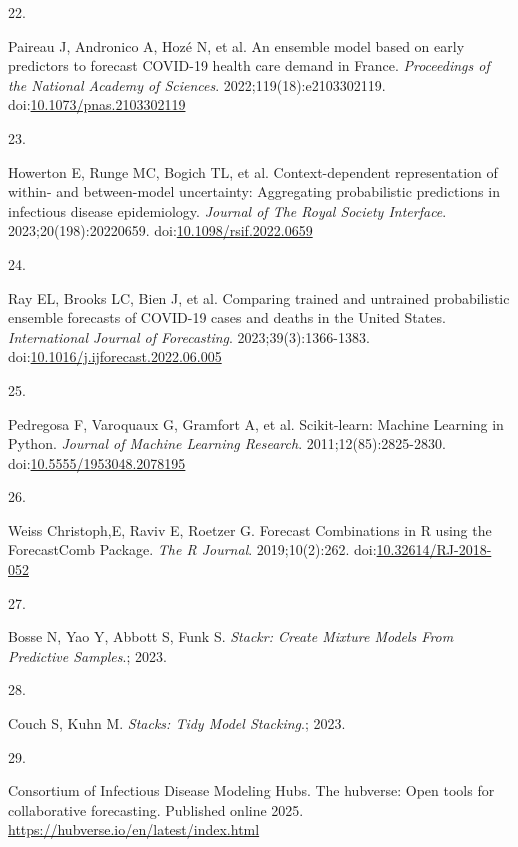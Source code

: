 \documentclass[
  letterpaper,
  DIV=11,
  numbers=noendperiod]{scrartcl}
\newlength{\cslhangindent}
\newlength{\csllabelwidth}
\newenvironment{CSLReferences}[2] %
 {\begin{list}{}{%
  \setlength{\itemindent}{0pt}
  \setlength{\leftmargin}{0pt}
  \setlength{\parsep}{0pt}
  \ifodd #1
   \setlength{\leftmargin}{\cslhangindent}
   \setlength{\itemindent}{-1\cslhangindent}
  \fi
  \setlength{\itemsep}{#2\baselineskip}}}
 {\end{list}}
\newcommand{\CSLLeftMargin}[1]{\parbox[t]{\csllabelwidth}{\strut#1\strut}}
\newcommand{\CSLRightInline}[1]{\parbox[t]{\linewidth - \csllabelwidth}{\strut#1\strut}}
\begin{document}
\begin{CSLReferences}{0}{1}
\CSLLeftMargin{22. }%
\CSLRightInline{Paireau J, Andronico A, Hozé N, et al. An ensemble model
based on early predictors to forecast {COVID}-19 health care demand in
{France}. \emph{Proceedings of the National Academy of Sciences}.
2022;119(18):e2103302119.
doi:\href{https://doi.org/10.1073/pnas.2103302119}{10.1073/pnas.2103302119}}

\CSLLeftMargin{23. }%
\CSLRightInline{Howerton E, Runge MC, Bogich TL, et al.
Context-dependent representation of within- and between-model
uncertainty: Aggregating probabilistic predictions in infectious disease
epidemiology. \emph{Journal of The Royal Society Interface}.
2023;20(198):20220659.
doi:\href{https://doi.org/10.1098/rsif.2022.0659}{10.1098/rsif.2022.0659}}

\CSLLeftMargin{24. }%
\CSLRightInline{Ray EL, Brooks LC, Bien J, et al. Comparing trained and
untrained probabilistic ensemble forecasts of {COVID}-19 cases and
deaths in the {United} {States}. \emph{International Journal of
Forecasting}. 2023;39(3):1366-1383.
doi:\href{https://doi.org/10.1016/j.ijforecast.2022.06.005}{10.1016/j.ijforecast.2022.06.005}}

\CSLLeftMargin{25. }%
\CSLRightInline{Pedregosa F, Varoquaux G, Gramfort A, et al.
Scikit-learn: {Machine} {Learning} in {Python}. \emph{Journal of Machine
Learning Research}. 2011;12(85):2825-2830.
doi:\href{https://doi.org/10.5555/1953048.2078195}{10.5555/1953048.2078195}}

\CSLLeftMargin{26. }%
\CSLRightInline{Weiss Christoph,E, Raviv E, Roetzer G. Forecast
Combinations in R using the ForecastComb Package. \emph{The R Journal}.
2019;10(2):262.
doi:\href{https://doi.org/10.32614/RJ-2018-052}{10.32614/RJ-2018-052}}

\CSLLeftMargin{27. }%
\CSLRightInline{Bosse N, Yao Y, Abbott S, Funk S. \emph{Stackr: {Create}
{Mixture} {Models} {From} {Predictive} {Samples}}.; 2023.}

\CSLLeftMargin{28. }%
\CSLRightInline{Couch S, Kuhn M. \emph{Stacks: Tidy Model Stacking}.;
2023.}

\CSLLeftMargin{29. }%
\CSLRightInline{Consortium of Infectious Disease Modeling Hubs. The
hubverse: Open tools for collaborative forecasting. Published online
2025. \url{https://hubverse.io/en/latest/index.html}}


\end{CSLReferences}
\end{document}
